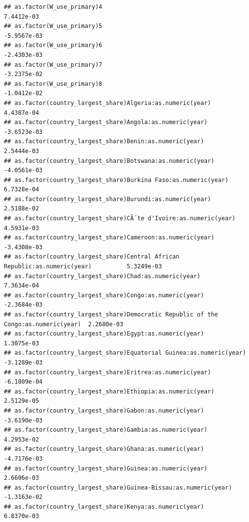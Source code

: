\documentclass[
  a4paper,
]{article}
\begin{document}
\begin{verbatim}
## as.factor(W_use_primary)4                                                          7.4412e-03
## as.factor(W_use_primary)5                                                         -5.9567e-03
## as.factor(W_use_primary)6                                                         -2.4303e-03
## as.factor(W_use_primary)7                                                         -3.2375e-02
## as.factor(W_use_primary)8                                                         -1.0412e-02
## as.factor(country_largest_share)Algeria:as.numeric(year)                           4.4387e-04
## as.factor(country_largest_share)Angola:as.numeric(year)                           -3.6523e-03
## as.factor(country_largest_share)Benin:as.numeric(year)                             2.5444e-03
## as.factor(country_largest_share)Botswana:as.numeric(year)                         -4.0561e-03
## as.factor(country_largest_share)Burkina Faso:as.numeric(year)                      6.7328e-04
## as.factor(country_largest_share)Burundi:as.numeric(year)                           2.5188e-02
## as.factor(country_largest_share)CÃ´te d'Ivoire:as.numeric(year)                    4.5931e-03
## as.factor(country_largest_share)Cameroon:as.numeric(year)                         -3.4308e-03
## as.factor(country_largest_share)Central African Republic:as.numeric(year)          5.3249e-03
## as.factor(country_largest_share)Chad:as.numeric(year)                              7.3634e-04
## as.factor(country_largest_share)Congo:as.numeric(year)                            -2.3684e-03
## as.factor(country_largest_share)Democratic Republic of the Congo:as.numeric(year)  2.2680e-03
## as.factor(country_largest_share)Egypt:as.numeric(year)                             1.3075e-03
## as.factor(country_largest_share)Equatorial Guinea:as.numeric(year)                -3.1289e-03
## as.factor(country_largest_share)Eritrea:as.numeric(year)                          -6.1809e-04
## as.factor(country_largest_share)Ethiopia:as.numeric(year)                          2.5129e-05
## as.factor(country_largest_share)Gabon:as.numeric(year)                            -3.6190e-03
## as.factor(country_largest_share)Gambia:as.numeric(year)                            4.2953e-02
## as.factor(country_largest_share)Ghana:as.numeric(year)                            -4.7176e-03
## as.factor(country_largest_share)Guinea:as.numeric(year)                            2.6606e-03
## as.factor(country_largest_share)Guinea-Bissau:as.numeric(year)                    -1.3163e-02
## as.factor(country_largest_share)Kenya:as.numeric(year)                             6.8370e-03

\end{verbatim}
\end{document}
